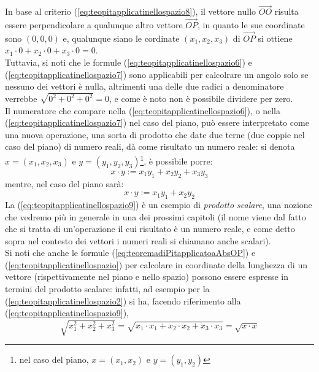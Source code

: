 \begin{oss}
  \label{oss:teopitapplicatinellospazio2}
  In base al criterio (\ref{eq:teopitapplicatinellospazio8}), il vettore nullo $\vec{OO}$ risulta essere perpendicolare a qualunque altro vettore $\vec{OP}$, in quanto le sue coordinate sono $(0,0,0)$ e, qualunque siano le cordinate $(x_1,x_2,x_3)$ di $\vec{OP}$ si ottiene $x_1\cdot0+x_2\cdot 0+ x_3\cdot 0=0$.\\
  Tuttavia, si noti che le formule (\ref{eq:teopitapplicatinellospazio6}) e (\ref{eq:teopitapplicatinellospazio7}) sono applicabili per calcolrare un angolo solo se nessuno dei vettori è nulla, altrimenti una delle due radici a denominatore verrebbe $\sqrt{0^2+0^2+0^2}=0$, e come è noto non è possibile dividere per zero.\\
  Il numeratore che compare nella (\ref{eq:teopitapplicatinellospazio6}), o nella (\ref{eq:teopitapplicatinellospazio7}) nel caso del piano, può essere interpretato come una nuova operazione, una sorta di prodotto che date due terne (due coppie nel caso del piano) di numero reali, dà come risultato un numero reale: si denota $x=(x_1,x_2,x_3)$ e $y=(y_1,y_2,y_3)$\footnote{nel caso del piano, $x=(x_1,x_2)$ e $y=(y_1,y_2)$}, è possibile porre:
  \begin{equation}
    \label{eq:teopitapplicatinellospazio9}
    x\cdot y:=x_1y_1+x_2y_2+x_3y_3
  \end{equation}
  mentre, nel caso del piano sarà:
  \begin{equation*}
    x\cdot y:=x_1y_1+x_2y_2
  \end{equation*}
  La (\ref{eq:teopitapplicatinellospazio9}) è un esempio di \textit{prodotto scalare}, una nozione che vedremo più in generale in una dei prossimi capitoli (il nome viene dal fatto che si tratta di un'operazione il cui risultato è un numero reale, e come detto sopra nel contesto dei vettori i numeri reali si chiamano anche scalari).\\
  Si noti che anche le formule (\ref{eq:teoremadiPitapplicatoaAbsOP}) e (\ref{eq:teopitapplicatinellospazio}) per calcolare in coordinate della lunghezza di un vettore (rispettivamente nel piano e nello spazio) possono essere espresse in termini del prodotto scalare: infatti, ad esempio per la (\ref{eq:teopitapplicatinellospazio2}) si ha, facendo riferimento alla (\ref{eq:teopitapplicatinellospazio9}),
  \begin{equation*}
    \sqrt{x_1^2+x_2^2+x_3^2}=\sqrt{x_1\cdot x_1+x_2\cdot x_2+x_3\cdot x_3}=\sqrt{x\cdot x}
  \end{equation*}
\end{oss}
